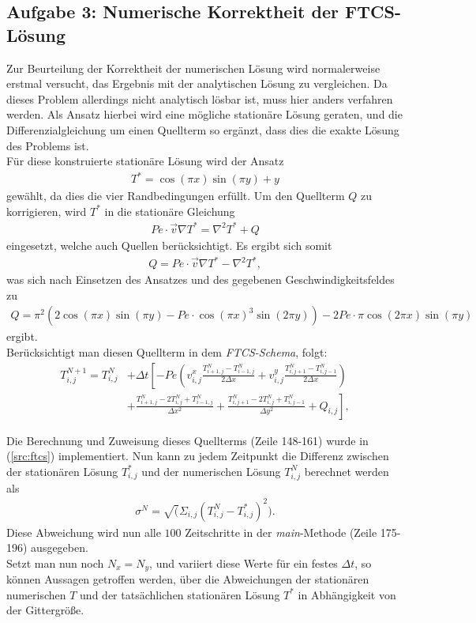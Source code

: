 \documentclass[12pt,a4paper,titlepage,headinclude,bibtotoc]{scrartcl}
\begin{document}
\subsection{Aufgabe 3: Numerische Korrektheit der FTCS-Lösung}
\label{sec:task3}
Zur Beurteilung der Korrektheit der numerischen Lösung wird normalerweise erstmal versucht, das Ergebnis mit der analytischen Lösung zu vergleichen. Da dieses Problem allerdings nicht analytisch lösbar ist, muss hier anders verfahren werden. Als Ansatz hierbei wird eine mögliche stationäre Lösung geraten, und die Differenzialgleichung um einen Quellterm so ergänzt, dass dies die exakte Lösung des Problems ist.\\
Für diese konstruierte stationäre Lösung wird der Ansatz
\begin{align*}
T^* = \cos(\pi x) \sin(\pi y) + y
\end{align*} 
gewählt, da dies die vier Randbedingungen erfüllt.
Um den Quellterm $Q$ zu korrigieren, wird $T^*$ in die stationäre Gleichung
\begin{align*}
Pe \cdot \vec{v} \nabla T^* = \nabla^2 T^* + Q 
\end{align*}
eingesetzt, welche auch Quellen berücksichtigt. Es ergibt sich somit
\begin{align*}
Q = Pe \cdot \vec{v} \nabla T^* - \nabla^2 T^*,
\end{align*}
was sich nach Einsetzen des Ansatzes und des gegebenen Geschwindigkeitsfeldes zu
\begin{align*}
Q = \pi^2 \left(2 \cos(\pi x) \sin(\pi y) - Pe \cdot \cos(\pi x)^3 \sin(2 \pi y) \right) - 2 Pe \cdot \pi \cos(2 \pi x) \sin(\pi y)
\end{align*}
ergibt.\\
Berücksichtigt man diesen Quellterm in dem \textit{FTCS-Schema}, folgt:
\begin{align}
\label{eq:ftcs_source}
T_{i,j}^{N+1} = T_{i,j}^N & + \Delta t \left[ -Pe \left( v^x_{i,j} \frac{T_{i+1,j}^N-T_{i-1,j}^N}{2\Delta x}+v^y_{i,j} \frac{T_{i,j+1}^N-T_{i,j-1}^N}{2\Delta x} \right) \right. \nonumber \\ 
 & \left.+ \frac{ T_{i+1,j}^N - 2 T_{i,j}^N +  T_{i-1,j}^N }{\Delta x^2} 
+ \frac{ T_{i,j+1}^N - 2  T_{i,j}^N + T_{i,j-1}^N}{\Delta y^2} + Q_{i,j} \right],
\end{align}

Die Berechnung und Zuweisung dieses Quellterms (Zeile 148-161) wurde in (\ref{src:ftcs}) implementiert. 
Nun kann zu jedem Zeitpunkt die Differenz zwischen der stationären Lösung $T_{i,j}^*$ und der numerischen Lösung $T_{i,j}^N$ berechnet werden als
\begin{align*}
\sigma^N = \sqrt(\Sigma_{i,j} (T_{i,j}^N - T_{i,j}^*)^2 ).
\end{align*}
Diese Abweichung wird nun alle $100$ Zeitschritte in der \textit{main}-Methode (Zeile 175-196) ausgegeben.\\
Setzt man nun noch $N_x = N_y$, und variiert diese Werte für ein festes $\Delta t$, so können Aussagen getroffen werden, über die Abweichungen der stationären numerischen $T$ und der tatsächlichen stationären Lösung $T^*$ in Abhängigkeit von der Gittergröße.
\end{document}
